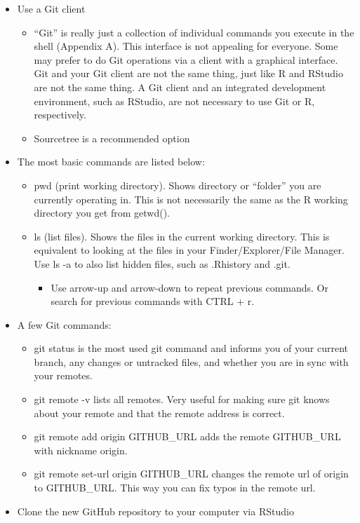 \documentclass[
]{article}
\providecommand{\tightlist}{%
  \setlength{\itemsep}{0pt}\setlength{\parskip}{0pt}}
\begin{document}
\begin{itemize}
\item
  Use a Git client

  \begin{itemize}
  \tightlist
  \item
    ``Git'' is really just a collection of individual commands you
    execute in the shell (Appendix A). This interface is not
    appealing for everyone. Some may prefer to do Git operations via
    a client with a graphical interface. Git and your Git client are
    not the same thing, just like R and RStudio are not the same
    thing. A Git client and an integrated development environment,
    such as RStudio, are not necessary to use Git or R,
    respectively.
  \item
    Sourcetree is a recommended option
  \end{itemize}
\item
  The most basic commands are listed below:

  \begin{itemize}
  \item
    pwd (print working directory). Shows directory or ``folder'' you
    are currently operating in. This is not necessarily the same as
    the R working directory you get from getwd().
  \item
    ls (list files). Shows the files in the current working
    directory. This is equivalent to looking at the files in your
    Finder/Explorer/File Manager. Use ls -a to also list hidden
    files, such as .Rhistory and .git.

    \begin{itemize}
    \tightlist
    \item
      Use arrow-up and arrow-down to repeat previous commands. Or
      search for previous commands with CTRL + r.
    \end{itemize}
  \end{itemize}
\item
  A few Git commands:

  \begin{itemize}
  \tightlist
  \item
    git status is the most used git command and informs you of your
    current branch, any changes or untracked files, and whether you
    are in sync with your remotes.
  \item
    git remote -v lists all remotes. Very useful for making sure git
    knows about your remote and that the remote address is correct.
  \item
    git remote add origin GITHUB\_URL adds the remote GITHUB\_URL with
    nickname origin.
  \item
    git remote set-url origin GITHUB\_URL changes the remote url of
    origin to GITHUB\_URL. This way you can fix typos in the remote
    url.
  \end{itemize}
\item
  Clone the new GitHub repository to your computer via RStudio


\end{itemize}
\end{document}

